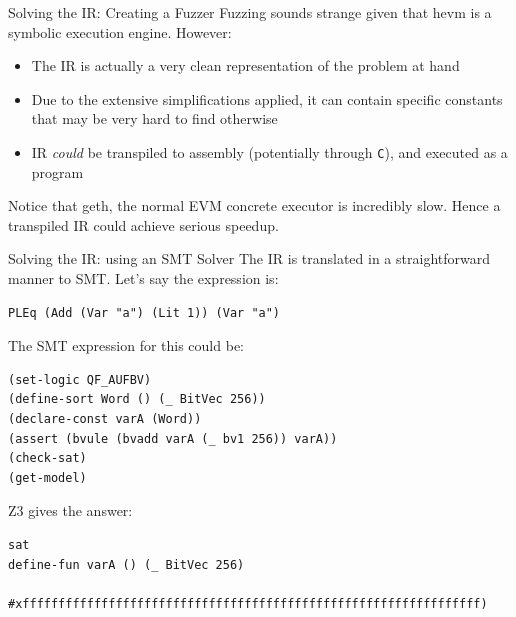 \documentclass[aspectratio=169]{beamer}
\begin{document}
\begin{frame}[fragile=singleslide]{Solving the IR: Creating a Fuzzer}
Fuzzing sounds strange given that hevm is a symbolic execution engine. However:
\begin{itemize}
\item The IR is actually a very clean representation of the problem at hand
\item Due to the extensive simplifications applied, it can contain specific constants that may be very hard to find otherwise
\item IR \emph{could} be transpiled to assembly (potentially through \texttt{C}), and executed as a program
\end{itemize}
\bigskip

Notice that geth, the normal EVM concrete executor is incredibly slow. Hence a transpiled IR could achieve serious speedup.
\end{frame}

\begin{frame}[fragile=singleslide]{Solving the IR: using an SMT Solver}
The IR is translated in a straightforward manner to SMT. Let's say the expression is:

\begin{Verbatim}[frame=single, framerule=0.2mm, framesep=2mm,fontsize=\footnotesize]
PLEq (Add (Var "a") (Lit 1)) (Var "a")
\end{Verbatim}

The SMT expression for this could be:
\begin{lstlisting}[language=smtlib]
(set-logic QF_AUFBV)
(define-sort Word () (_ BitVec 256))
(declare-const varA (Word))
(assert (bvule (bvadd varA (_ bv1 256)) varA))
(check-sat)
(get-model)
\end{lstlisting}

Z3 gives the answer:
\begin{Verbatim}[frame=single, framerule=0.2mm, framesep=2mm,fontsize=\footnotesize]
sat
define-fun varA () (_ BitVec 256)
    #xffffffffffffffffffffffffffffffffffffffffffffffffffffffffffffffff)
\end{Verbatim}
\end{frame}
\end{document}
